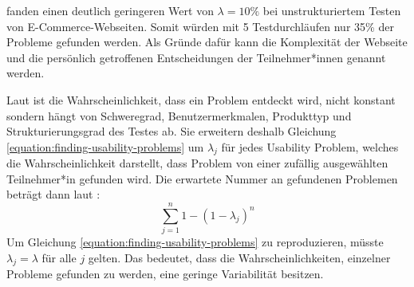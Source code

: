 \textcite{spoolTestingWeb2001} fanden einen deutlich geringeren Wert von $\lambda{}=10\%$ bei unstrukturiertem Testen von E-Commerce-Webseiten. Somit würden mit 5 Testdurchläufen nur 35\% der Probleme gefunden werden. Als Gründe dafür kann die Komplexität der Webseite und die persönlich getroffenen Entscheidungen der Teilnehmer*innen genannt werden.
\parencite{spoolTestingWeb2001}

Laut \textcite{woolrychWhyWhen2001} ist die Wahrscheinlichkeit, dass ein Problem entdeckt wird, nicht konstant sondern hängt von Schweregrad, Benutzermerkmalen, Produkttyp und Strukturierungsgrad des Testes ab. Sie erweitern deshalb Gleichung \ref{equation:finding-usability-problems} um $\lambda{}_j$ für jedes Usability Problem, welches die Wahrscheinlichkeit darstellt, dass Problem von einer zufällig ausgewählten Teilnehmer*in gefunden wird. Die erwartete Nummer an gefundenen Problemen beträgt dann laut \textcite{woolrychWhyWhen2001}:
\begin{equation}
 \sum_{j=1}^n 1-(1-\lambda{}_j)^n
\end{equation}
Um Gleichung \ref{equation:finding-usability-problems} zu reproduzieren, müsste $\lambda{}_j = \lambda{}$ für alle $j$ gelten. Das bedeutet, dass die Wahrscheinlichkeiten, einzelner Probleme gefunden zu werden, eine geringe Variabilität besitzen. 
\parencite{woolrychWhyWhen2001}
